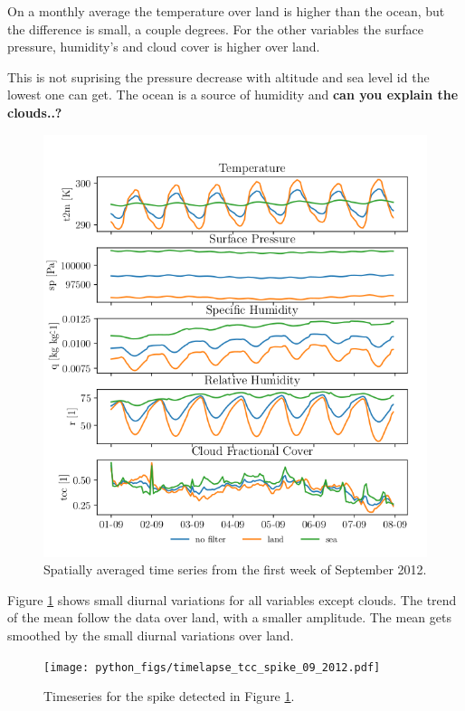 On a monthly average the temperature over land is higher than the ocean, but the difference is small, a couple degrees. For the other variables the surface pressure, humidity's and cloud cover is higher over land. 

This is not suprising the pressure decrease with altitude and sea level id the lowest one can get. The ocean is a source of humidity and \textbf{can you explain the clouds..?}

\begin{figure}[ht]
    \centering
    \includegraphics{python_figs/spatially_averaged_one_week_from_2012-09-01.png}
    \caption{Spatially averaged time series from the first week of September 2012.}
    \label{fig:first_week_sep_2012}
\end{figure}
Figure \ref{fig:first_week_sep_2012} shows small diurnal variations for all variables except clouds. The trend of the mean follow the data over land, with a smaller amplitude. The mean gets smoothed by the small diurnal variations over land. 

\begin{figure}
    \centering
    \texttt{[image: python\_figs/timelapse\_tcc\_spike\_09\_2012.pdf]}
    \caption{Timeseries for the spike detected in Figure \ref{fig:first_week_sep_2012}.}
    \label{fig:spike_sep_2012}
\end{figure}


